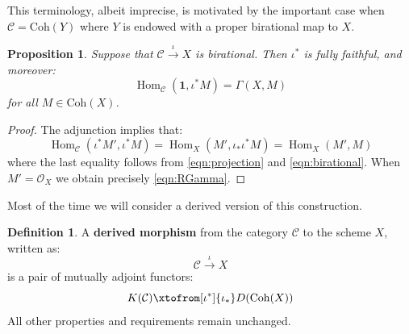 \documentclass[12pt]{amsart}
\numberwithin{equation}{section}
\newtheorem{proposition}[theorem]{Proposition}
\theoremstyle{definition}
\newtheorem{definition}[theorem]{Definition}
\theoremstyle{remark}
\newtheorem{remark}[theorem]{Remark}
\DeclareMathOperator{\Hom}{Hom}
\newcommand{\cat}{\mathcal{C}}
\newcommand{\CO}{\mathcal{O}}
\renewcommand{\1}{\mathbf{1}}
\newcommand{\coh}{\mathrm{Coh}}
\begin{document}
This terminology, albeit imprecise, is motivated by the important case when $\cat = \coh(Y)$ where $Y$ is endowed with a proper birational map to $X$. 

\begin{proposition}
\label{prop: proper hom}
Suppose that $\cat \stackrel{\iota}\longrightarrow X$ is birational. Then $\iota^*$ is fully faithful, and moreover:
\begin{equation}
\label{eqn:RGamma}
\Hom_{\cat}(\1,\iota^* M) = \Gamma(X,M)
\end{equation}
for all $M\in \coh(X)$.
\end{proposition}

\begin{proof} The adjunction implies that:
$$
\Hom_{\cat}(\iota^*M',\iota^*M) = \Hom_X(M',\iota_*\iota^*M) = \Hom_X(M',M)
$$
where the last equality follows from \eqref{eqn:projection} and \eqref{eqn:birational}. When $M'=\CO_X$ we obtain precisely \eqref{eqn:RGamma}.

\end{proof}


Most of the time we will consider a derived version of this construction.

\begin{definition}
 A \textbf{derived morphism} from the category $\cat$ to the scheme $X$, written as:
$$
\cat \stackrel{\iota}{\longrightarrow} X
$$
is a pair of  mutually adjoint functors:
\begin{equation}
\label{eqn:derfunctors}
K(\cat) \xtofrom[\iota^*]{\iota_*} D(\coh(X)) 
\end{equation}
All other properties and requirements remain unchanged. 
\end{definition}


\end{document}
